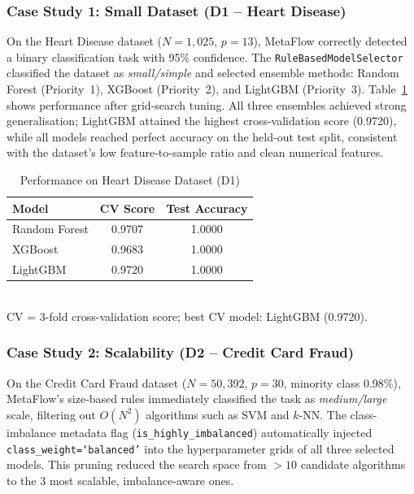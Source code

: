 \documentclass[conference]{IEEEtran}
\begin{document}
   \subsubsection{Case Study 1: Small Dataset (D1 -- Heart Disease)}
   On the Heart Disease dataset ($N=1{,}025$, $p=13$), MetaFlow correctly detected a binary classification task with 95\% confidence. The \texttt{RuleBasedModelSelector} classified the dataset as \emph{small/simple} and selected ensemble methods: Random Forest (Priority~1), XGBoost (Priority~2), and LightGBM (Priority~3).
   Table~\ref{tab:d1_results} shows performance after grid-search tuning. All three ensembles achieved strong generalisation; LightGBM attained the highest cross-validation score (0.9720), while all models reached perfect accuracy on the held-out test split, consistent with the dataset's low feature-to-sample ratio and clean numerical features.

   \begin{table}[htbp]
   \centering
   \caption{Performance on Heart Disease Dataset (D1)}
   \label{tab:d1_results}
   \small
   \begin{tabular}{lcc}
   \hline
   \textbf{Model} & \textbf{CV Score} & \textbf{Test Accuracy} \\
   \hline
   Random Forest & 0.9707 & 1.0000 \\
   XGBoost       & 0.9683 & 1.0000 \\
   LightGBM      & 0.9720 & 1.0000 \\
   \hline
   \end{tabular}
    \vspace{1mm}
    \\{\scriptsize CV = 3-fold cross-validation score; best CV model: LightGBM (0.9720).}
    \end{table}

   \subsubsection{Case Study 2: Scalability (D2 -- Credit Card Fraud)}
   On the Credit Card Fraud dataset ($N=50{,}392$, $p=30$, minority class 0.98\%), MetaFlow's size-based rules immediately classified the task as \emph{medium/large} scale, filtering out $O(N^2)$ algorithms such as SVM and $k$-NN. The class-imbalance metadata flag (\texttt{is\_highly\_imbalanced}) automatically injected \texttt{class\_weight=`balanced'} into the hyperparameter grids of all three selected models. This pruning reduced the search space from $>10$ candidate algorithms to the 3 most scalable, imbalance-aware ones.
\end{document}

